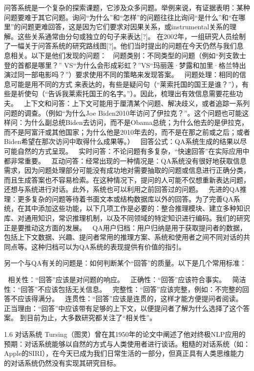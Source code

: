 问答系统是一个复杂的探索课题，它涉及众多问题。举例来说，有证据表明：某种问题要难于其它问题。询问“为什么”和“怎样”的问题往往比询问“是什么”和“在哪里”的问题更难回答，这是因为它们要求对因果关系，或instrumental关系的理解。这些关系通常由分句或独立的句子来表达[?]。
在2002年，一组研究人员绘制了一幅关于问答系统的研究路线图[?]。他们当时提出的问题在今天仍然与我们息息相关。以下是他们发现的问题：
	问题类别：不同类型的问题（例如“列支敦士登的首都是哪里？” VS“为什么会形成彩虹？”VS“玛丽莲·梦露和加里·格兰特出演过同一部电影吗？”）要求使用不同的策略来发现答案。
	问题处理：相同的信息可能是用不同的方式 来表达的，有些是疑问句（“莱索托国的国王是谁？”），有些是祈使句（“告诉我莱索托国王的名字。”）。因此，梳理出有效信息需要花些功夫。
	上下文和问答：上下文可能用于厘清某个问题、解决歧义，或者追踪一系列问题的调查。（例如“为什么Joe Biden2010年访问了伊拉克？”。这个问题也可能这样问：为什么副总统Biden去访问，而不是Obama总统；为什么他去的是伊拉克，而不是阿富汗或其他国家；为什么他是2010年去的，而不是在那之前或之后；或者Biden希望在那次访问中取得什么成果等。）
	回答公式：QA系统生成的结果以尽可能自然的方式呈现。
	实时问答：不论问题有多复杂，“快速回答”在实际应用中都非常重要。
	互动问答：经常出现的一种情况是：QA系统没有很好地获取信息需求，因为问题处理部分可能没有成功地对需要抽取的问题或信息进行正确分类，而且生成答案也不容易检索。在这种情况下，提问的人可能不仅想重新表达问题，还想与系统进行对话。此外，系统也可以利用之前回答过的问题。
	先进的QA推理：更多复杂的问题等待着书面文本或结构数据库以外的回答。为了完善QA系统，在其中添加这些功能，以下几项工作是必要的：整合推理模块、建立多种知识库、对通用知识，常识推理机制，以及不同领域的特定知识进行编码。我们的研究正是要推动这方面的发展。
	QA用户归档：用户归纳是用于获取提问者的数据，包括上下文数据、兴趣、提问者常用的推理方案、系统和使用者之间不同对话的共同点等。这种归档可以为QA系统的表现提供有价值的指引。

另一个与QA有关的问题是：如何判断某个“回答”的质量。以下是几个常用标准：

	相关性：“回答”应该是对问题的响应。
	正确性：“回答”应该符合事实。
	简洁性：“回答”不应该包括无关信息。
	完整性：“回答”应该完整，例如：不完整的回答不应该得满分。
	连贯性：“回答”应该是连贯的，这样才能方便提问者阅读。
	正当理由：“回答”中应该带有足够的上下文，以便提问者了解为什么选择了这个答案。
到目前为止，大多数研究都关注了“相关性”。

1.6 对话系统
Tursing（图灵）曾在其1950年的论文中阐述了他对终极NLP应用的预期：对话系统能够以自然的方式与人类使用者进行谈话。粗糙的对话系统（如：Apple的SIRI），在今天已成为我们日常生活的一部分，但真正具有人类思维能力的对话系统仍然没有实现其研究目标。

